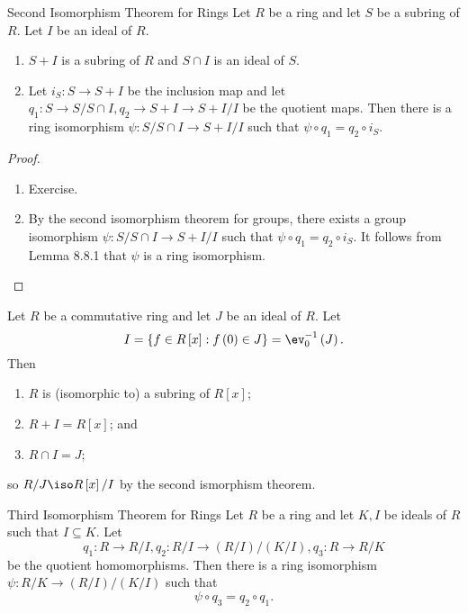 \documentclass[pmath347]{subfiles}
\begin{document}
    \clearpage
    \begin{theorem}{Second Isomorphism Theorem for Rings}
        Let $R$ be a ring and let $S$ be a subring of $R$. Let $I$ be an ideal of $R$.
        \begin{enumerate}
            \item $S+I$ is a subring of $R$ and $S\cap I$ is an ideal of $S$.
            \item Let $i_S:S\to S+I$ be the inclusion map and let $q_1:S\to S /S\cap I, q_2\to S+I\to S+ I /I$ be the quotient maps. Then there is a ring isomorphism $\psi:S /S\cap I\to S+ I /I$ such that $\psi\circ q_1 = q_2\circ i_S$.
        \end{enumerate}
    \end{theorem}

    \begin{proof}
        \begin{enumerate}
            \item Exercise. \qqqedsym

            \item By the second isomorphism theorem for groups, there exists a group isomorphism $\psi:S /S\cap I\to S + I /I$ such that $\psi\circ q_1 = q_2\circ i_S$. It follows from Lemma 8.8.1 that $\psi$ is a ring isomorphism. \qqedsym
        \end{enumerate}
    \end{proof}

    \ex Let $R$ be a commutative ring and let $J$ be an ideal of $R$. Let
    \begin{equation*}
        I = \left\lbrace f\in R\left[ x \right] : f\left( 0 \right) \in J \right\rbrace = \ev_0^{-1} \left( J \right) .
    \end{equation*}
    Then
    \begin{enumerate}
        \item $R$ is (isomorphic to) a subring of $R\left[ x \right]$;
        \item $R+I=R\left[ x \right]$; and
        \item $R\cap I=J$;
    \end{enumerate}
    so $R /J\iso R\left[ x \right] / I$ by the second ismorphism theorem.
    
    \begin{theorem}{Third Isomorphism Theorem for Rings}
        Let $R$ be a ring and let $K,I$ be ideals of $R$ such that $I\subseteq K$. Let
        \begin{equation*}
            q_1:R\to R /I, q_2:R /I\to \left( R /I \right) / \left( K /I \right) , q_3: R\to R /K
        \end{equation*}
        be the quotient homomorphisms. Then there is a ring isomorphism $\psi:R /K\to \left( R /I \right) / \left( K /I \right)$ such that
        \begin{equation*}
            \psi\circ q_3 = q_2\circ q_1.
        \end{equation*}
    \end{theorem}
    
\end{document}

